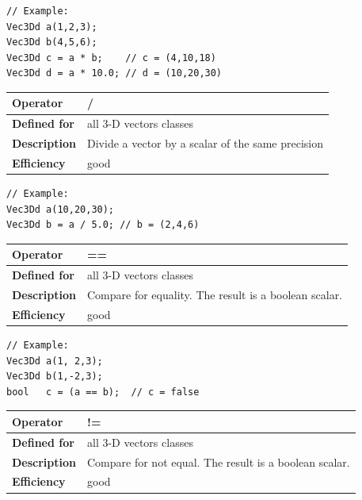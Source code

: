 \documentclass[11pt,a4paper,oneside,openright]{report}
\newcommand{\vspacesmall}{\vspace{3mm}}
\newcommand{\vspacebig}{\vspace{6mm}}
\begin{document}
\begin{lstlisting}[frame=none]
// Example:
Vec3Dd a(1,2,3);
Vec3Dd b(4,5,6);
Vec3Dd c = a * b;    // c = (4,10,18)
Vec3Dd d = a * 10.0; // d = (10,20,30)
\end{lstlisting}
\vspacebig


\begin{tabular}{|p{25mm}|p{100mm}|}
\hline
\bfseries Operator & / \\ \hline
\bfseries Defined for & all 3-D vectors classes  \\ \hline
\bfseries Description & Divide a vector by a scalar of the same precision \\ \hline
\bfseries Efficiency & good \\ \hline
\end{tabular}
\vspacesmall

\begin{lstlisting}[frame=none]
// Example:
Vec3Dd a(10,20,30);
Vec3Dd b = a / 5.0; // b = (2,4,6)
\end{lstlisting}
\vspacebig


\begin{tabular}{|p{25mm}|p{100mm}|}
\hline
\bfseries Operator & == \\ \hline
\bfseries Defined for & all 3-D vectors classes  \\ \hline
\bfseries Description & Compare for equality.\newline
The result is a boolean scalar. \\ \hline
\bfseries Efficiency & good \\ \hline
\end{tabular}
\vspacesmall

\begin{lstlisting}[frame=none]
// Example:
Vec3Dd a(1, 2,3);
Vec3Dd b(1,-2,3);
bool   c = (a == b);  // c = false
\end{lstlisting}
\vspacebig


\begin{tabular}{|p{25mm}|p{100mm}|}
\hline
\bfseries Operator & != \\ \hline
\bfseries Defined for & all 3-D vectors classes  \\ \hline
\bfseries Description & Compare for not equal.\newline
The result is a boolean scalar. \\ \hline
\bfseries Efficiency & good \\ \hline
\end{tabular}
\vspacesmall
\end{document}

